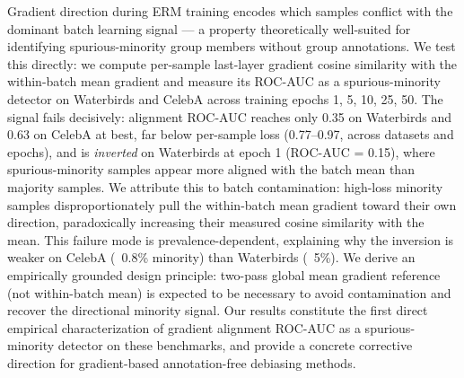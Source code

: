 
Gradient direction during ERM training encodes which samples conflict with the dominant batch learning signal --- a property theoretically well-suited for identifying spurious-minority group members without group annotations. We test this directly: we compute per-sample last-layer gradient cosine similarity with the within-batch mean gradient and measure its ROC-AUC as a spurious-minority detector on Waterbirds and CelebA across training epochs {1, 5, 10, 25, 50}. The signal fails decisively: alignment ROC-AUC reaches only 0.35 on Waterbirds and 0.63 on CelebA at best, far below per-sample loss (0.77--0.97, across datasets and epochs), and is \textit{inverted} on Waterbirds at epoch 1 (ROC-AUC = 0.15), where spurious-minority samples appear more aligned with the batch mean than majority samples. We attribute this to batch contamination: high-loss minority samples disproportionately pull the within-batch mean gradient toward their own direction, paradoxically increasing their measured cosine similarity with the mean. This failure mode is prevalence-dependent, explaining why the inversion is weaker on CelebA (~0.8\% minority) than Waterbirds (~5\%). We derive an empirically grounded design principle: two-pass global mean gradient reference (not within-batch mean) is expected to be necessary to avoid contamination and recover the directional minority signal. Our results constitute the first direct empirical characterization of gradient alignment ROC-AUC as a spurious-minority detector on these benchmarks, and provide a concrete corrective direction for gradient-based annotation-free debiasing methods.

